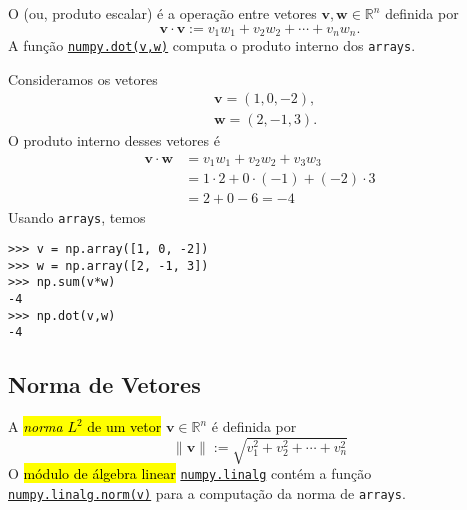O  (ou, produto escalar) é a operação entre vetores $\pmb{v},\pmb{w}\in\mathbb{R}^n$ definida por
\begin{equation}
  \pmb{v}\cdot\pmb{v} := v_1w_1+v_2w_2+\cdots+v_nw_n.
\end{equation}
A função \href{https://numpy.org/doc/stable/reference/generated/numpy.dot.html}{\texttt{numpy.dot(v,w)}} computa o produto interno dos \lstinline+arrays+.

\begin{ex}
  Consideramos os vetores
  \begin{align}
    &\pmb{v} = (1, 0, -2),\\
    &\pmb{w} = (2, -1, 3).
  \end{align}
  O produto interno desses vetores é
  \begin{subequations}
    \begin{align}
    \pmb{v}\cdot\pmb{w} &= v_1w_1 + v_2w_2 + v_3w_3\\
                        &= 1\cdot 2 + 0\cdot(-1) + (-2)\cdot 3\\
                        &= 2 + 0 -6 = -4
    \end{align}
  \end{subequations}
  Usando \lstinline+arrays+, temos

\begin{lstlisting}
>>> v = np.array([1, 0, -2])
>>> w = np.array([2, -1, 3])
>>> np.sum(v*w)
-4
>>> np.dot(v,w)
-4
\end{lstlisting}

\end{ex}

\subsection{Norma de Vetores}

A \hl{\emph{norma} $L^2$ de um vetor} $\pmb{v}\in\mathbb{R}^n$ é definida por
\begin{equation}
  \|\pmb{v}\| := \sqrt{v_1^2+v_2^2+\cdots+v_n^2}
\end{equation}
O \hl{módulo de álgebra linear} \href{https://numpy.org/doc/stable/reference/routines.linalg.html}{\lstinline+numpy.linalg+} contém a função \href{https://numpy.org/doc/stable/reference/generated/numpy.linalg.norm.html}{\lstinline+numpy.linalg.norm(v)+} para a computação da norma de \lstinline+arrays+.


